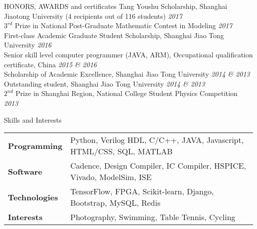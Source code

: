 \documentclass{resume_Stanford} %
\begin{document}
\begin{rSection}{HONORS, AWARDS and certificates}
Tang Youshu Scholarship, Shanghai Jiaotong University (4 recipients out of 116 students) \hfill \emph{2017}
\\$3^{rd}$ Prize in National Post-Graduate Mathematic Contest in Modeling \hfill \emph{2017}
\\First-class Academic Graduate Student Scholarship, Shanghai Jiao Tong University  \hfill \emph{2016}
\\Senior skill level computer programmer (JAVA, ARM), Occupational qualification certificate, China \hfill \emph{2015 \& 2016}
\\Scholarship of Academic Excellence, Shanghai Jiao Tong University \hfill \emph{2014 \& 2013}
\\Outstanding student, Shanghai Jiao Tong University \hfill \emph{2014 \& 2013}
\\$2^{nd}$ Prize in Shanghai Region, National College Student Physics Competition \hfill \emph{2013}
\end{rSection}

\begin{rSection}{Skills and Interests}
\begin{tabular}{ll}
\textbf{Programming \qquad} & Python, Verilog HDL, C/C++, JAVA, Javascript, HTML/CSS, SQL, MATLAB\\
\textbf{Software} & Cadence, Design Compiler, IC Compiler, HSPICE, Vivado, ModelSim, ISE\\
\textbf{Technologies} & TensorFlow, FPGA, Scikit-learn, Django, Bootstrap, MySQL, Redis\\
\textbf{Interests} & Photography, Swimming, Table Tennis, Cycling\\
\end{tabular}
\end{rSection}
\end{document}
